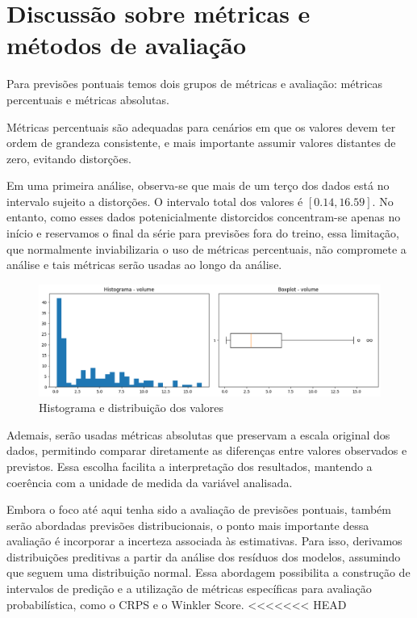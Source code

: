 \documentclass{article}
\begin{document}
\section*{Discussão sobre métricas e métodos de avaliação}

Para previsões pontuais temos dois grupos de métricas e avaliação: métricas percentuais e métricas absolutas.

Métricas percentuais são adequadas para cenários em que os valores devem ter ordem de grandeza consistente, e mais importante assumir valores distantes de zero, evitando distorções. 

Em uma primeira análise, observa-se que mais de um terço dos dados está no intervalo sujeito a distorções. O intervalo total dos valores é $[0.14, 16.59]$. No entanto, como esses dados potenicialmente distorcidos concentram-se apenas no início e reservamos o final da série para previsões fora do treino, essa limitação, que normalmente inviabilizaria o uso de métricas percentuais, não compromete a análise e tais métricas serão usadas ao longo da análise.


\begin{figure}[h]
    \centering
    \includegraphics[width=0.75\linewidth]{images/histogram.png}
    \caption{Histograma e distribuição dos valores}
\end{figure}

Ademais, serão usadas métricas absolutas que preservam a escala original dos dados, permitindo comparar diretamente as diferenças entre valores observados e previstos. Essa escolha facilita a interpretação dos resultados, mantendo a coerência com a unidade de medida da variável analisada.

Embora o foco até aqui tenha sido a avaliação de previsões pontuais, também serão abordadas previsões distribucionais, o ponto mais importante dessa avaliação é incorporar a incerteza associada às estimativas.
Para isso, derivamos distribuições preditivas a partir da análise dos resíduos dos modelos, assumindo que seguem uma distribuição normal. Essa abordagem possibilita a construção de intervalos de predição e a utilização de métricas específicas para avaliação probabilística, como o CRPS e o Winkler Score.
<<<<<<< HEAD
\end{document}
